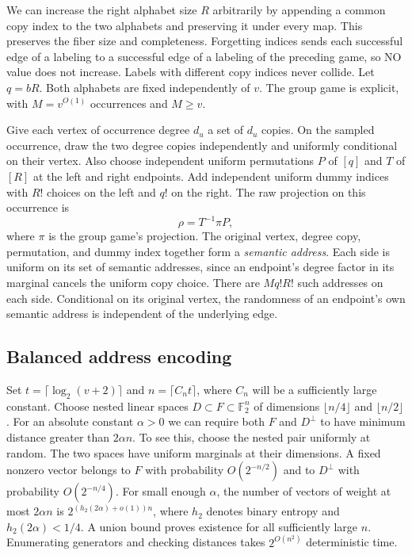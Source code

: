 \documentclass[11pt]{article}
\newcommand{\F}{\mathbb{F}}
\begin{document}
We can increase the right alphabet size $R$ arbitrarily by
appending a common copy index to the two alphabets and preserving it
under every map. This preserves the fiber size and completeness.
Forgetting indices sends each successful edge of a labeling to a
successful edge of a labeling of the preceding game, so NO value
does not increase. Labels with different copy indices never collide.
Let $q=bR$. Both alphabets are fixed independently of $v$. The group
game is explicit, with $M=v^{O(1)}$ occurrences and $M\ge v$.

Give each vertex of occurrence degree $d_u$ a set of $d_u$ copies.
On the sampled occurrence, draw the two degree copies independently and
uniformly conditional on their vertex. Also choose independent uniform
permutations $P$ of $[q]$ and $T$ of $[R]$ at the left and right endpoints.
Add independent uniform dummy indices with $R!$ choices on the left and
$q!$ on the right. The raw projection on this occurrence is
\[
  \rho=T^{-1}\pi P ,
\]
where $\pi$ is the group game's projection. The original vertex, degree
copy, permutation, and dummy index together form a \emph{semantic address}.
Each side is uniform on its set of semantic addresses, since an endpoint's
degree factor in its marginal cancels the uniform copy choice. There are
$M q!R!$ such addresses on each side. Conditional on its original vertex,
the randomness of an endpoint's own semantic address is independent
of the underlying edge.

\subsection{Balanced address encoding}\label{sec:codes}

Set $t=\lceil\log_2(v+2)\rceil$ and $n=\lceil C_n t\rceil$,
where $C_n$ will be a sufficiently large constant. Choose nested linear
spaces $D\subset F\subset\F_2^n$ of dimensions $\lfloor n/4\rfloor$
and $\lfloor n/2\rfloor$. For an absolute constant $\alpha>0$ we can
require both $F$ and $D^\perp$ to have minimum distance greater than
$2\alpha n$. To see this, choose the nested pair uniformly at random.
The two spaces have uniform marginals at their dimensions. A fixed
nonzero vector belongs to $F$ with probability $O(2^{-n/2})$ and
to $D^\perp$ with probability $O(2^{-n/4})$. For small enough $\alpha$,
the number of vectors of weight at most $2\alpha n$ is
$2^{(h_2(2\alpha)+o(1))n}$, where $h_2$ denotes binary entropy and
$h_2(2\alpha)<1/4$. A union bound proves existence for all sufficiently
large $n$. Enumerating generators and checking distances takes
$2^{O(n^2)}$ deterministic time.
\end{document}
